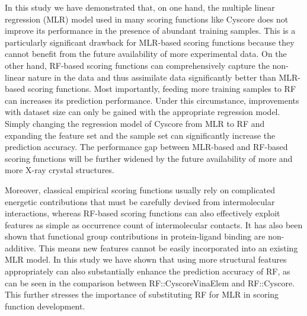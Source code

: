 In this study we have demonstrated that, on one hand, the multiple linear regression (MLR) model used in many scoring functions like Cyscore does not improve its performance in the presence of abundant training samples. This is a particularly significant drawback for MLR-based scoring functions because they cannot benefit from the future availability of more experimental data. On the other hand, RF-based scoring functions can comprehensively capture the non-linear nature in the data and thus assimilate data significantly better than MLR-based scoring functions. Most importantly, feeding more training samples to RF can increases its prediction performance. Under this circumstance, improvements with dataset size can only be gained with the appropriate regression model. Simply changing the regression model of Cyscore from MLR to RF and expanding the feature set and the sample set can significantly increase the prediction accuracy. The performance gap between MLR-based and RF-based scoring functions will be further widened by the future availability of more and more X-ray crystal structures.

Moreover, classical empirical scoring functions usually rely on complicated energetic contributions that must be carefully devised from intermolecular interactions, whereas RF-based scoring functions can also effectively exploit features as simple as occurrence count of intermolecular contacts. It has also been shown that functional group contributions in protein-ligand binding are non-additive. This means new features cannot be easily incorporated into an existing MLR model. In this study we have shown that using more structural features appropriately can also substantially enhance the prediction accuracy of RF, as can be seen in the comparison between RF::CyscoreVinaElem and RF::Cyscore. This further stresses the importance of substituting RF for MLR in scoring function development.

\chapterend
